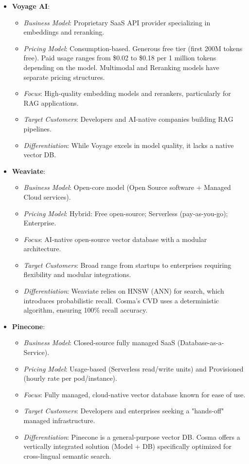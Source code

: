 \begin{itemize}
    \item \textbf{Voyage AI}:
    \begin{itemize}[noitemsep]
        \item \textit{Business Model}: Proprietary SaaS API provider specializing in embeddings and reranking.
        \item \textit{Pricing Model}: Consumption-based. Generous free tier (first 200M tokens free). Paid usage ranges from \$0.02 to \$0.18 per 1 million tokens depending on the model. Multimodal and Reranking models have separate pricing structures.
        \item \textit{Focus}: High-quality embedding models and rerankers, particularly for RAG applications.
        \item \textit{Target Customers}: Developers and AI-native companies building RAG pipelines.
        \item \textit{Differentiation}: While Voyage excels in model quality, it lacks a native vector DB.
    \end{itemize}

    \item \textbf{Weaviate}:
    \begin{itemize}[noitemsep]
        \item \textit{Business Model}: Open-core model (Open Source software + Managed Cloud services).
        \item \textit{Pricing Model}: Hybrid: Free open-source; Serverless (pay-as-you-go); Enterprise.
        \item \textit{Focus}: AI-native open-source vector database with a modular architecture.
        \item \textit{Target Customers}: Broad range from startups to enterprises requiring flexibility and modular integrations.
        \item \textit{Differentiation}: Weaviate relies on HNSW (ANN) for search, which introduces probabilistic recall. Cosma's CVD uses a deterministic algorithm, ensuring 100\% recall accuracy.
    \end{itemize}

    \item \textbf{Pinecone}:
    \begin{itemize}[noitemsep]
        \item \textit{Business Model}: Closed-source fully managed SaaS (Database-as-a-Service).
        \item \textit{Pricing Model}: Usage-based (Serverless read/write units) and Provisioned (hourly rate per pod/instance).
        \item \textit{Focus}: Fully managed, cloud-native vector database known for ease of use.
        \item \textit{Target Customers}: Developers and enterprises seeking a "hands-off" managed infrastructure.
        \item \textit{Differentiation}: Pinecone is a general-purpose vector DB. Cosma offers a vertically integrated solution (Model + DB) specifically optimized for cross-lingual semantic search.
    \end{itemize}


\end{itemize}
